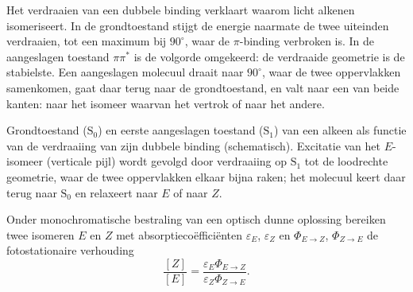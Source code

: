 Het verdraaien van een dubbele binding verklaart waarom licht alkenen
isomeriseert. In de grondtoestand stijgt de energie naarmate de twee
uiteinden verdraaien, tot een maximum bij $90^\circ$, waar de $\pi$-binding
verbroken is. In de aangeslagen toestand $\pi\pi^*$ is de volgorde
omgekeerd: de verdraaide geometrie is de stabielste. Een aangeslagen
molecuul draait naar
$90^\circ$, waar de twee oppervlakken samenkomen, gaat daar terug naar de
grondtoestand, en valt naar een van beide kanten: naar het isomeer
waarvan het vertrok of naar het andere.

\begin{omfigure}

{\small Grondtoestand ($\mathrm S_0$) en eerste aangeslagen toestand
($\mathrm S_1$) van een alkeen als functie van de verdraaiing van zijn
dubbele binding (schematisch). Excitatie van het $E$-isomeer (verticale
pijl) wordt gevolgd door verdraaiing op $\mathrm S_1$ tot de loodrechte
geometrie, waar de twee oppervlakken elkaar bijna raken; het molecuul
keert daar terug naar $\mathrm S_0$ en relaxeert naar $E$ of naar
$Z$.}
\end{omfigure}

\begin{proposition}\label{prop:b3:photochemistry:pss}
Onder monochromatische bestraling van een optisch dunne oplossing
bereiken twee isomeren $E$
en $Z$ met absorptiecoëfficiënten $\varepsilon_E$, $\varepsilon_Z$ en  $\Phi_{E\to Z}$,
$\Phi_{Z\to E}$ de fotostationaire verhouding
\[
  \frac{[Z]}{[E]} = \frac{\varepsilon_E\Phi_{E\to Z}}{\varepsilon_Z\Phi_{Z\to E}} .
\]
\end{proposition}

